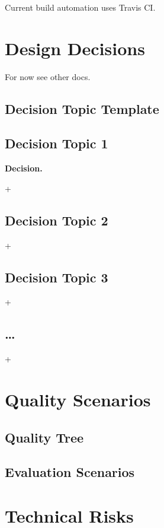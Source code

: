 \documentclass[]{article}
\begin{document}
Current build automation uses Travis CI.

\section{Design Decisions}

For now see other docs.

\subsection{Decision Topic Template}

\subsection{Decision Topic 1}

\textbf{Decision.}

+

\subsection{Decision Topic 2}

+

\subsection{Decision Topic 3}

+

\subsection{\ldots{}}

+

\section{Quality Scenarios}

\subsection{Quality Tree}

\subsection{Evaluation Scenarios}

\section{Technical Risks}
\end{document}
